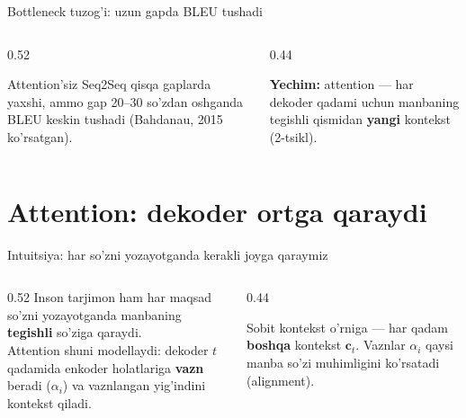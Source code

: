 \documentclass[aspectratio=169,11pt]{beamer}
\begin{document}
\begin{frame}{Bottleneck tuzog'i: uzun gapda BLEU tushadi}
  \begin{columns}[T]
    \begin{column}{0.52\textwidth}
      \begin{tcolorbox}[warnbox,title=Uzunlik bilan sifat pasayadi]
        \small
        Attention'siz Seq2Seq qisqa gaplarda yaxshi, ammo gap 20--30 so'zdan
        oshganda BLEU keskin tushadi (Bahdanau, 2015 ko'rsatgan).
      \end{tcolorbox}
    \end{column}
    \begin{column}{0.44\textwidth}
      \begin{tcolorbox}[okbox,top=2pt,bottom=2pt]
        \footnotesize
        \textbf{Yechim:} attention --- har dekoder qadami uchun manbaning
        tegishli qismidan \textbf{yangi} kontekst (2-tsikl).
      \end{tcolorbox}
    \end{column}
  \end{columns}
\end{frame}

\section[Attention]{Attention: dekoder ortga qaraydi}

\begin{frame}{Intuitsiya: har so'zni yozayotganda kerakli joyga qaraymiz}
  \begin{columns}[T]
    \begin{column}{0.52\textwidth}
      \small
      Inson tarjimon ham har maqsad so'zni yozayotganda manbaning \textbf{tegishli}
      so'ziga qaraydi.\\[6pt]
      Attention shuni modellaydi: dekoder $t$ qadamida enkoder holatlariga
      \textbf{vazn} beradi ($\alpha_i$) va vaznlangan yig'indini kontekst qiladi.
    \end{column}
    \begin{column}{0.44\textwidth}
      \begin{tcolorbox}[okbox,top=2pt,bottom=2pt]
        \footnotesize
        Sobit kontekst o'rniga --- har qadam \textbf{boshqa} kontekst $\mathbf{c}_t$.
        Vaznlar $\alpha_i$ qaysi manba so'zi muhimligini ko'rsatadi (alignment).
      \end{tcolorbox}
    \end{column}
  \end{columns}
\end{frame}
\end{document}
